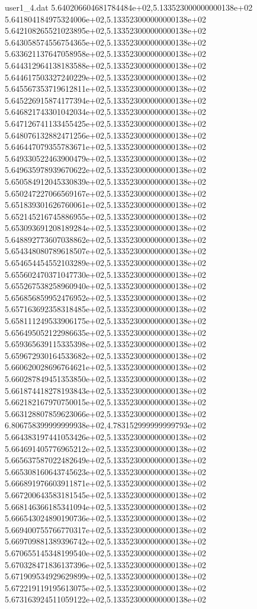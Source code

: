 \begin{filecontents}{user1_4.dat}
5.640206604681784484e+02,5.133523000000000138e+02
5.641804184975324006e+02,5.133523000000000138e+02
5.642108265521023895e+02,5.133523000000000138e+02
5.643058574556754365e+02,5.133523000000000138e+02
5.633621137647058958e+02,5.133523000000000138e+02
5.644312964138183588e+02,5.133523000000000138e+02
5.644617503327240229e+02,5.133523000000000138e+02
5.645567353719612811e+02,5.133523000000000138e+02
5.645226915874177394e+02,5.133523000000000138e+02
5.646821743301042034e+02,5.133523000000000138e+02
5.647126741133455425e+02,5.133523000000000138e+02
5.648076132882471256e+02,5.133523000000000138e+02
5.646447079355783671e+02,5.133523000000000138e+02
5.649330522463900479e+02,5.133523000000000138e+02
5.649635978939670622e+02,5.133523000000000138e+02
5.650584912045330839e+02,5.133523000000000138e+02
5.650247227066569167e+02,5.133523000000000138e+02
5.651839301626760061e+02,5.133523000000000138e+02
5.652145216745886955e+02,5.133523000000000138e+02
5.653093691208189284e+02,5.133523000000000138e+02
5.648892773607038862e+02,5.133523000000000138e+02
5.654348080789618507e+02,5.133523000000000138e+02
5.654654454552103289e+02,5.133523000000000138e+02
5.655602470371047730e+02,5.133523000000000138e+02
5.655267538258960940e+02,5.133523000000000138e+02
5.656856859952476952e+02,5.133523000000000138e+02
5.657163692358318485e+02,5.133523000000000138e+02
5.658111249533906175e+02,5.133523000000000138e+02
5.656495052122986635e+02,5.133523000000000138e+02
5.659365639115335398e+02,5.133523000000000138e+02
5.659672930164533682e+02,5.133523000000000138e+02
5.660620028696764621e+02,5.133523000000000138e+02
5.660287849451353850e+02,5.133523000000000138e+02
5.661874418278193843e+02,5.133523000000000138e+02
5.662182167970750015e+02,5.133523000000000138e+02
5.663128807859623066e+02,5.133523000000000138e+02
6.806758399999999938e+02,4.783152999999999793e+02
5.664383197441053426e+02,5.133523000000000138e+02
5.664691405776965212e+02,5.133523000000000138e+02
5.665637587022482649e+02,5.133523000000000138e+02
5.665308160643745623e+02,5.133523000000000138e+02
5.666891976603911871e+02,5.133523000000000138e+02
5.667200643583181545e+02,5.133523000000000138e+02
5.668146366185341094e+02,5.133523000000000138e+02
5.666543024890190736e+02,5.133523000000000138e+02
5.669400755766770317e+02,5.133523000000000138e+02
5.669709881389396742e+02,5.133523000000000138e+02
5.670655145348199540e+02,5.133523000000000138e+02
5.670328471836137396e+02,5.133523000000000138e+02
5.671909534929629899e+02,5.133523000000000138e+02
5.672219119195613075e+02,5.133523000000000138e+02
5.673163924511059122e+02,5.133523000000000138e+02

\end{filecontents}
